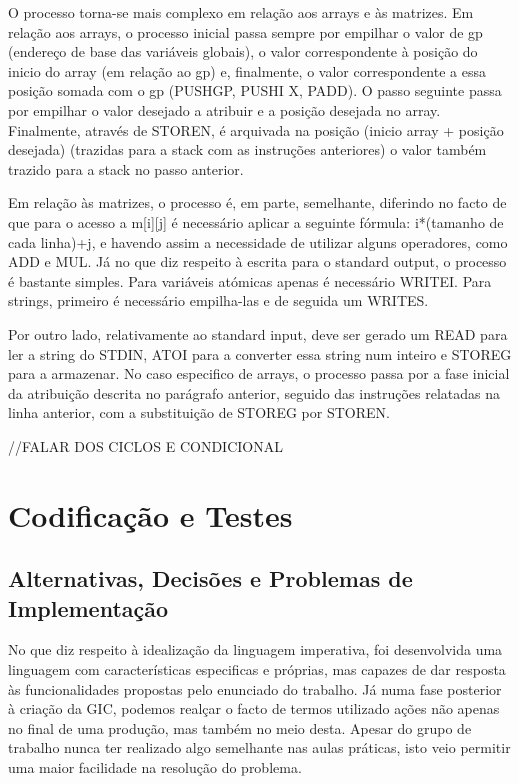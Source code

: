 \documentclass{report}
\begin{document}
O processo torna-se mais complexo em relação aos arrays e às matrizes. Em relação aos arrays, o processo inicial passa sempre por empilhar o valor de gp (endereço de base das variáveis globais), o valor correspondente à posição do inicio do array (em relação ao gp) e, finalmente, o valor correspondente a essa posição somada com o gp (PUSHGP, PUSHI X, PADD). O passo seguinte passa por empilhar o valor desejado a atribuir e a posição desejada no array. Finalmente, através de STOREN, é arquivada na posição (inicio array + posição desejada) (trazidas para a stack com as instruções anteriores) o valor também trazido para a stack no passo anterior.  
 
Em relação às matrizes, o processo é, em parte, semelhante, diferindo no facto de que para o acesso a m[i][j] é necessário aplicar a seguinte fórmula: i*(tamanho de cada linha)+j, e havendo assim a necessidade de utilizar alguns operadores, como ADD e MUL. 
Já no que diz respeito à escrita para o standard output, o processo é bastante simples. Para variáveis atómicas apenas é necessário WRITEI. Para strings, primeiro é necessário empilha-las e de seguida um WRITES. 

Por outro lado, relativamente ao standard input, deve ser gerado um READ para ler a string do STDIN, ATOI para a converter essa string num inteiro e STOREG para a armazenar. No caso especifico de arrays, o processo passa por a fase inicial da atribuição descrita no parágrafo anterior, seguido das instruções relatadas na linha anterior, com a substituição de STOREG por STOREN.

//FALAR DOS CICLOS E CONDICIONAL 

\chapter{Codificação e Testes} \label{ct}
\section{Alternativas, Decisões e Problemas de Implementação}

No que diz respeito à idealização da linguagem imperativa, foi desenvolvida uma linguagem com características especificas e próprias, mas capazes de dar resposta às funcionalidades propostas pelo enunciado do trabalho. Já numa fase posterior à criação da GIC, podemos realçar o facto de termos utilizado ações não apenas no final de uma produção, mas também no meio desta. Apesar do grupo de trabalho nunca ter realizado algo semelhante nas aulas práticas, isto veio permitir uma maior facilidade na resolução do problema.
\end{document}
